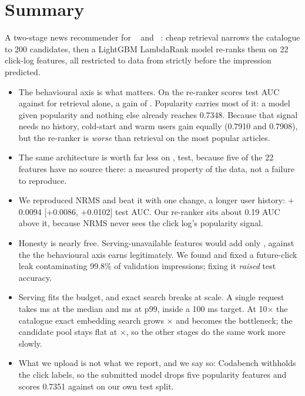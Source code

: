 \section*{Summary}

A two-stage news recommender for \eb{}~\cite{kruse2024} and \mind{}~\cite{wu2020mind}: cheap
retrieval narrows the catalogue to 200 candidates, then a LightGBM LambdaRank model re-ranks them
on 22 click-log features, all restricted to data from strictly before the impression predicted.

\begin{itemize}
\item The behavioural axis is what matters. On \eb{} the re-ranker scores \EBFinalTest{}
  test AUC against \EBFusedTest{} for retrieval alone, a gain of \EBGainTest{} \EBGainTestCI.
  Popularity carries most of it: a model given popularity and nothing else already reaches 0.7348.
  Because that signal needs no history, cold-start and warm users gain equally (0.7910 and 0.7908),
  but the re-ranker is \emph{worse} than retrieval on the most popular articles.
\item The same architecture is worth far less on \mind{}, \MDGainTest{} \MDGainTestCI{}
  test, because five of the 22 features have no source there: a measured property of the data, not
  a failure to reproduce.
\item We reproduced NRMS and beat it with one change, a longer user history:
  $+$0.0094 [$+$0.0086, $+$0.0102] test AUC. Our re-ranker sits about 0.19 AUC above it, because
  NRMS never sees the click log's popularity signal.
\item Honesty is nearly free. Serving-unavailable features would add only \QnineDelta{}
  \QnineCI, against the \EBGainTest{} the behavioural axis earns legitimately. We found and fixed a
  future-click leak contaminating 99.8\% of validation impressions; fixing it \emph{raised} test
  accuracy.
\item Serving fits the budget, and exact search breaks at scale. A single request takes
  \BenchPfifty{} ms at the median and \BenchPninetynine{} ms at p99, inside a 100 ms target. At
  10$\times$ the catalogue exact embedding search grows \BenchAnnGrowth$\times$ and becomes the
  bottleneck; the candidate pool stays flat at \PoolGrowth$\times$, so the other stages do the same
  work more slowly.
\item What we upload is not what we report, and we say so: Codabench withholds the click
  labels, so the submitted model drops five popularity features and scores 0.7351 against
  \EBFinalTest{} on our own test split.
\end{itemize}
